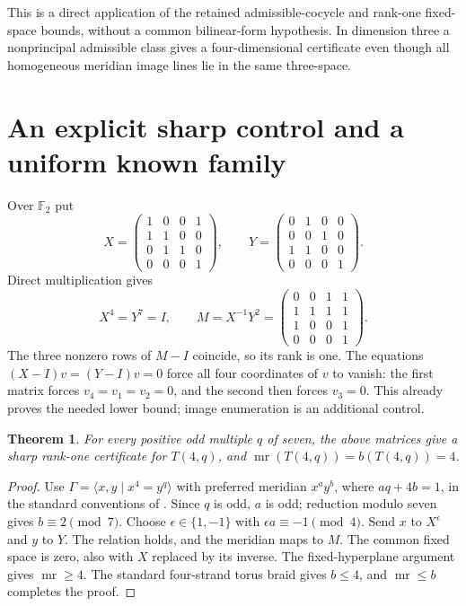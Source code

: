 \documentclass[11pt]{article}
\newtheorem{theorem}{Theorem}
\newcommand{\F}{\mathbb F}
\newcommand{\mr}{\operatorname{mr}}
\begin{document}
This is a direct application of the retained admissible-cocycle and
rank-one fixed-space bounds, without a common bilinear-form
hypothesis. In dimension three a nonprincipal admissible class
gives a four-dimensional certificate even though all homogeneous
meridian image lines lie in the same three-space.

\section{An explicit sharp control and a uniform known family}

Over $\F_2$ put
\[
 X=\begin{pmatrix}1&0&0&1\\1&1&0&0\\0&1&1&0\\0&0&0&1\end{pmatrix},
 \qquad
 Y=\begin{pmatrix}0&1&0&0\\0&0&1&0\\1&1&0&0\\0&0&0&1\end{pmatrix}.
\]
Direct multiplication gives
\[
 X^4=Y^7=I,\qquad
 M=X^{-1}Y^2=
 \begin{pmatrix}0&0&1&1\\1&1&1&1\\1&0&0&1\\0&0&0&1\end{pmatrix}.
\]
The three nonzero rows of $M-I$ coincide, so its rank is one.
The equations $(X-I)v=(Y-I)v=0$ force all four coordinates of $v$
to vanish: the first matrix forces $v_4=v_1=v_2=0$, and the second
then forces $v_3=0$. This already proves the needed lower bound;
image enumeration is an additional control.

\begin{theorem}\label{thm:torus}
For every positive odd multiple $q$ of seven, the above matrices
give a sharp rank-one certificate for $T(4,q)$, and
$\mr(T(4,q))=b(T(4,q))=4$.
\end{theorem}
\begin{proof}
Use $\Gamma=\langle x,y\mid x^4=y^q\rangle$ with preferred
meridian $x^a y^b$, where $a q+4b=1$, in the standard conventions
of \cite[Section 5.1]{cornwell}. Since $q$ is odd, $a$ is odd;
reduction modulo seven gives $b\equiv2\pmod7$.
Choose $\epsilon\in\{1,-1\}$ with
$\epsilon a\equiv-1\pmod4$. Send $x$ to $X^\epsilon$ and $y$ to
$Y$. The relation holds, and the meridian maps to $M$.
The common fixed space is zero, also with $X$ replaced by its
inverse. The fixed-hyperplane argument gives $\mr\ge4$.
The standard four-strand torus braid gives $b\le4$, and
$\mr\le b$ completes the proof.
\end{proof}
\end{document}
